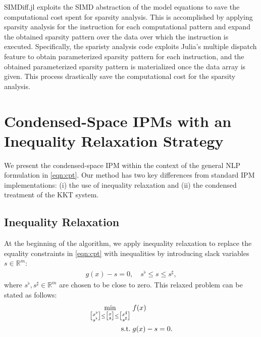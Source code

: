 SIMDiff.jl exploits the SIMD abstraction of the model equations to
save the computational cost spent for sparsity analysis.  This is
accomplished by applying sparsity analysis for the instruction for
each computational pattern and expand the obtained sparsity pattern
over the data over which the instruction is executed. Specifically,
the sparisty analysis code exploits Julia's multiple dispatch feature
to obtain parameterized sparsity pattern for each instruction, and the
obtained parameterized sparsity pattern is materialized once the data
array is given. This process drastically save the computational cost
for the sparsity analysis.

\section{Condensed-Space IPMs with an Inequality Relaxation Strategy}\label{sec:ipm}
We present the condensed-space IPM within the
context of the general NLP formulation in \eqref{eqn:cpt}. Our method
has two key differences from standard IPM
implementations: (i) the use of inequality relaxation and (ii) the
condensed treatment of the KKT system.

\subsection{Inequality Relaxation}

At the beginning of the algorithm, we apply inequality relaxation to replace the equality constraints in \eqref{eqn:cpt} with inequalities by introducing slack variables $s\in\mathbb{R}^{m}$:
\begin{align}\label{eqn:relax}
  g(x)- s = 0,\quad s^{\flat}\leq s\leq  s^\sharp,
\end{align}
where $s^\flat,s^\sharp\in\mathbb{R}^{m}$ are chosen to be close to zero.
This relaxed problem can be stated as follows:
\begin{align}\label{eqn:relaxed} 
  \begin{aligned}[t]
    \min_{\big[\substack{x^\flat\\s^\flat}\big]\leq \big[\substack{x\\s}\big] \leq \big[\substack{x^\sharp\\s^\sharp}\big]}\;
    &  f(x)\\
    \mathop{\text{\normalfont s.t.}}\;
    & g(x) - s = 0.
  \end{aligned}
\end{align}

